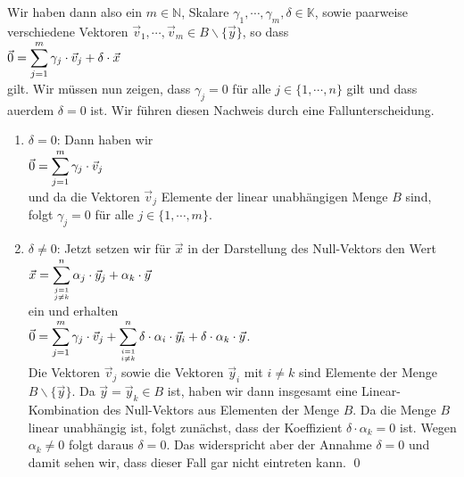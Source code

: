 \begin{enumerate}
      Wir haben dann also ein $m \in \mathbb{N}$, Skalare $\gamma_1, \cdots, \gamma_m, \delta \in \mathbb{K}$,
      sowie paarweise verschiedene Vektoren $\vec{v}_1, \cdots, \vec{v}_m \in B \backslash \{ \vec{y} \}$, so dass
      \\[0.2cm]
      \hspace*{1.3cm}
      $\displaystyle\vec{0} = \sum\limits_{j=1}^m \gamma_j \cdot \vec{v}_j + \delta \cdot \vec{x}$
      \\[0.2cm]
      gilt.  Wir m\"{u}ssen nun zeigen, dass $\gamma_j = 0$ f\"{u}r alle $j \in \{1,\cdots,n\}$ gilt und dass au\3erdem 
      $\delta = 0$ ist.  Wir f\"{u}hren diesen Nachweis durch eine Fallunterscheidung.
      \begin{enumerate}
      \item $\delta = 0$:  Dann haben wir
            \\[0.2cm]
            \hspace*{1.3cm}
            $\displaystyle\vec{0} = \sum\limits_{j=1}^m \gamma_j \cdot \vec{v}_j$
            \\[0.2cm]
            und da die Vektoren $\vec{v}_j$ Elemente der linear unabh\"{a}ngigen Menge $B$ sind, folgt 
            $\gamma_j = 0$ f\"{u}r alle $j \in \{1,\cdots,m\}$.   
      \item $\delta \not= 0$:  Jetzt setzen wir f\"{u}r $\vec{x}$ in der Darstellung des Null-Vektors den Wert 
            \\[0.2cm]
            \hspace*{1.3cm}
            $\displaystyle\vec{x} = \sum\limits_{j=1 \atop j \not= k}^n \alpha_j \cdot \vec{y}_j +  \alpha_k \cdot \vec{y}$
            \\[0.2cm]
            ein und erhalten
            \\[0.2cm]
            \hspace*{1.3cm}
            $\displaystyle\vec{0} = \sum\limits_{j=1}^m \gamma_j \cdot \vec{v}_j + \sum\limits_{i=1 \atop i \not= k}^n \delta\cdot \alpha_i \cdot \vec{y}_i + \delta\cdot \alpha_k \cdot \vec{y}$.
            \\[0.2cm]
            Die Vektoren $\vec{v}_j$ sowie die Vektoren $\vec{y}_i$ mit $i \not= k$ sind Elemente der Menge
            $B \backslash \{ \vec{y} \}$.  Da $\vec{y} = \vec{y}_k \in B$ ist,  haben wir dann insgesamt eine Linear-Kombination des Null-Vektors aus
            Elementen der Menge $B$.  Da die Menge $B$ linear unabh\"{a}ngig ist, folgt zun\"{a}chst, dass der Koeffizient
            $\delta\cdot \alpha_k = 0$  ist.  Wegen $\alpha_k \not= 0$ folgt daraus $\delta = 0$.  Das widerspricht aber der Annahme $\delta = 0$
            und damit sehen wir, dass dieser Fall gar nicht eintreten kann.
            \qed
      \end{enumerate}
\end{enumerate}

